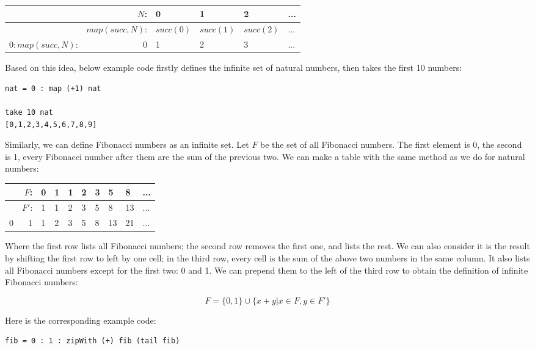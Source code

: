 \documentclass{article}
\begin{document}
\vspace{5mm}
\begin{tabular}{|r|r|l|l|l|l|}
\hline
                 & $N$: & 0 & 1 & 2 & ... \\
\hline
                 & $map(succ, N)$: & $succ(0)$ & $succ(1)$ & $succ(2)$ & ... \\
\hline
$0 : map(succ, N)$: & 0 & 1 & 2 & 3 & ... \\
\hline
\end{tabular}
\vspace{5mm}

Based on this idea, below example code firstly defines the infinite set of natural numbers, then takes the first 10 numbers:

\lstset{frame=single}
\begin{lstlisting}
nat = 0 : map (+1) nat

take 10 nat
[0,1,2,3,4,5,6,7,8,9]
\end{lstlisting}

Similarly, we can define Fibonacci numbers as an infinite set. Let $F$ be the set of all Fibonacci numbers. The first element is 0, the second is 1, every Fibonacci number after them are the sum of the previous two. We can make a table with the same method as we do for natural numbers:

\vspace{5mm}
\begin{tabular}{|r|r|l|l|l|l|l|l|l|l|}
\hline
  & $F$:  & 0 & 1 & 1 & 2 & 3 & 5 & 8 & ... \\
\hline
  & $F'$: & 1 & 1 & 2 & 3 & 5 & 8 & 13 & ... \\
\hline
0 & 1     & 1 & 2 & 3 & 5 & 8 & 13 & 21 & ... \\
\hline
\end{tabular}
\vspace{5mm}

Where the first row lists all Fibonacci numbers; the second row removes the first one, and lists the rest. We can also consider it is the result by shifting the first row to left by one cell; in the third row, every cell is the sum of the above two numbers in the same column. It also lists all Fibonacci numbers except for the first two: 0 and 1. We can prepend them to the left of the third row to obtain the definition of infinite Fibonacci numbers:

\[
F = \{0, 1\} \cup \{ x + y | x \in F, y \in F'\}
\]

Here is the corresponding example code:
\begin{lstlisting}
fib = 0 : 1 : zipWith (+) fib (tail fib)
\end{lstlisting}
\end{document}
